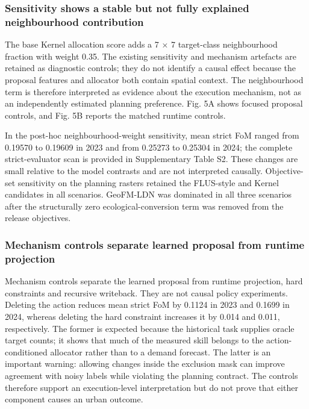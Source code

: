 \documentclass[
]{article}
\begin{document}
\subsubsection{Sensitivity shows a stable but not fully explained
neighbourhood
contribution}\label{sensitivity-shows-a-stable-but-not-fully-explained-neighbourhood-contribution}

The base Kernel allocation score adds a 7 × 7 target-class neighbourhood
fraction with weight 0.35. The existing sensitivity and mechanism
artefacts are retained as diagnostic controls; they do not identify a
causal effect because the proposal features and allocator both contain
spatial context. The neighbourhood term is therefore interpreted as
evidence about the execution mechanism, not as an independently
estimated planning preference. Fig. 5A shows focused proposal controls,
and Fig. 5B reports the matched runtime controls.

In the post-hoc neighbourhood-weight sensitivity, mean strict FoM ranged
from 0.19570 to 0.19609 in 2023 and from 0.25273 to 0.25304 in 2024; the
complete strict-evaluator scan is provided in Supplementary Table S2.
These changes are small relative to the model contrasts and are not
interpreted causally. Objective-set sensitivity on the planning rasters
retained the FLUS-style and Kernel candidates in all scenarios.
GeoFM-LDN was dominated in all three scenarios after the structurally
zero ecological-conversion term was removed from the release objectives.

\subsubsection{Mechanism controls separate learned proposal from runtime
projection}\label{mechanism-controls-separate-learned-proposal-from-runtime-projection}

Mechanism controls separate the learned proposal from runtime
projection, hard constraints and recursive writeback. They are not
causal policy experiments. Deleting the action reduces mean strict FoM
by 0.1124 in 2023 and 0.1699 in 2024, whereas deleting the hard
constraint increases it by 0.014 and 0.011, respectively. The former is
expected because the historical task supplies oracle target counts; it
shows that much of the measured skill belongs to the action-conditioned
allocator rather than to a demand forecast. The latter is an important
warning: allowing changes inside the exclusion mask can improve
agreement with noisy labels while violating the planning contract. The
controls therefore support an execution-level interpretation but do not
prove that either component causes an urban outcome.
\end{document}
